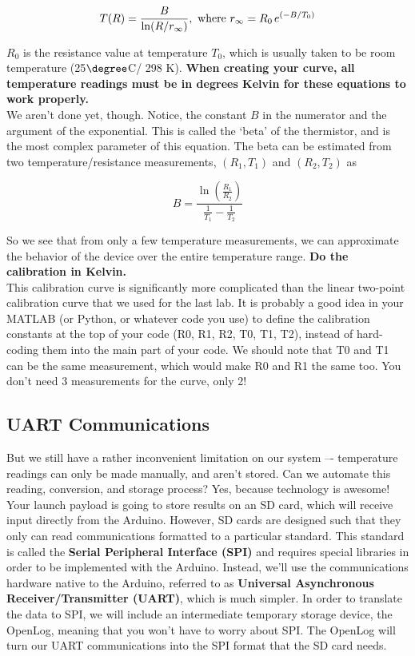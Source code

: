 \documentclass[12pt]{article}
\begin{document}
    $$T(R) = \frac{B}{\ln({R/r_{\infty}})}, \textnormal{ where } r_{\infty} = R_0\hspace{1.5pt}e^{(-B/T_0)}$$
    
    $R_0$ is the resistance value at temperature $T_0$, which is usually taken to be room temperature (25$\degree$C/ 298 K). \textbf{When creating your curve, all temperature readings must be in degrees Kelvin for these equations to work properly.}\\
    
    We aren't done yet, though. Notice, the constant $B$ in the numerator and the argument of the exponential. This is called the `beta' of the thermistor, and is the most complex parameter of this equation. The beta can be estimated from two temperature/resistance measurements, $(R_1, T_1)$ and $(R_2, T_2)$ as
    
    $$B = \frac{\ln(\frac{R_1}{R_2})}{\frac{1}{T_1} - \frac{1}{T_2}}$$
    
    So we see that from only a few temperature measurements, we can approximate the behavior of the device over the entire temperature range. \textbf{Do the calibration in Kelvin.} \\
    
    This calibration curve is significantly more complicated than the linear two-point calibration curve that we used for the last lab.  It is probably a good idea in your MATLAB (or Python, or whatever code you use) to define the calibration constants at the top of your code (R0, R1, R2, T0, T1, T2), instead of hard-coding them into the main part of your code.  We should note that T0 and T1 can be the same measurement, which would make R0 and R1 the same too. You don't need 3 measurements for the curve, only 2!
    
    \newpage
    \subsection*{UART Communications}
    But we still have a rather inconvenient limitation on our system –- temperature readings can only be made manually, and aren't stored. Can we automate this reading, conversion, and storage process? Yes, because technology is awesome! \\
	
	Your launch payload is going to store results on an SD card, which will receive input directly from the Arduino. However, SD cards are designed such that they only can read communications formatted to a particular standard. This standard is called the \textbf{Serial Peripheral Interface (SPI)} and requires special libraries in order to be implemented with the Arduino. Instead, we'll use the communications hardware native to the Arduino, referred to as \textbf{Universal Asynchronous Receiver/Transmitter (UART)}, which is much simpler. In order to translate the data to SPI, we will include an intermediate temporary storage device, the OpenLog, meaning that you won't have to worry about SPI. The OpenLog will turn our UART communications into the SPI format that the SD card needs.
	
\end{document}
